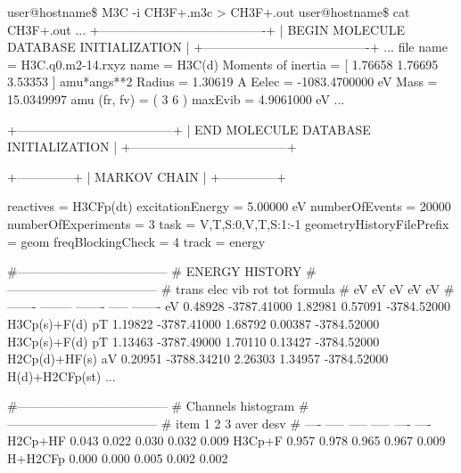 \documentclass[a4paper,12pt]{article}
\begin{document}
\begin{shellexec}
user@hostname\$ M3C -i CH3F+.m3c > CH3F+.out
user@hostname\$ cat CH3F+.out
... 
     +----------------------------------------+
     | BEGIN MOLECULE DATABASE INITIALIZATION |
     +----------------------------------------+
...
              file name = H3C.q0.m2-14.rxyz
                   name = H3C(d)
     Moments of inertia = [       1.76658       1.76695       3.53353  ]   amu*angs**2
                 Radius =         1.30619   A
                  Eelec =   -1083.4700000   eV
                   Mass =      15.0349997   amu
               (fr, fv) = (    3    6  )
                maxEvib =       4.9061000   eV
...

     +--------------------------------------+
     | END MOLECULE DATABASE INITIALIZATION |
     +--------------------------------------+

     +--------------+
     | MARKOV CHAIN |
     +--------------+
     
                       reactives = H3CFp(dt)
                excitationEnergy =         5.00000 eV
                  numberOfEvents =           20000
             numberOfExperiments =               3
                            task = V,T,S:0,V,T,S:1:-1
       geometryHistoryFilePrefix = geom
               freqBlockingCheck =               4
                           track = energy

#------------------------------------
# ENERGY HISTORY
#------------------------------------
#             trans           elec            vib            rot            tot     formula
#                eV             eV             eV             eV             eV
#           -------       --------        -------          -----        -------
 eV         0.48928    -3787.41000        1.82981        0.57091    -3784.52000     H3Cp(s)+F(d)
 pT         1.19822    -3787.41000        1.68792        0.00387    -3784.52000     H3Cp(s)+F(d)
 pT         1.13463    -3787.49000        1.70110        0.13427    -3784.52000     H2Cp(d)+HF(s)
 aV         0.20951    -3788.34210        2.26303        1.34957    -3784.52000     H(d)+H2CFp(st)
...

#------------------------------------
# Channels histogram
#------------------------------------
#            item         1         2         3           aver      desv
#            ----     -----     -----     -----           ----      ----
          H2Cp+HF     0.043     0.022     0.030          0.032     0.009
          H3Cp+F      0.957     0.978     0.965          0.967     0.009
          H+H2CFp     0.000     0.000     0.005          0.002     0.002
 

\end{shellexec}
\end{document}
